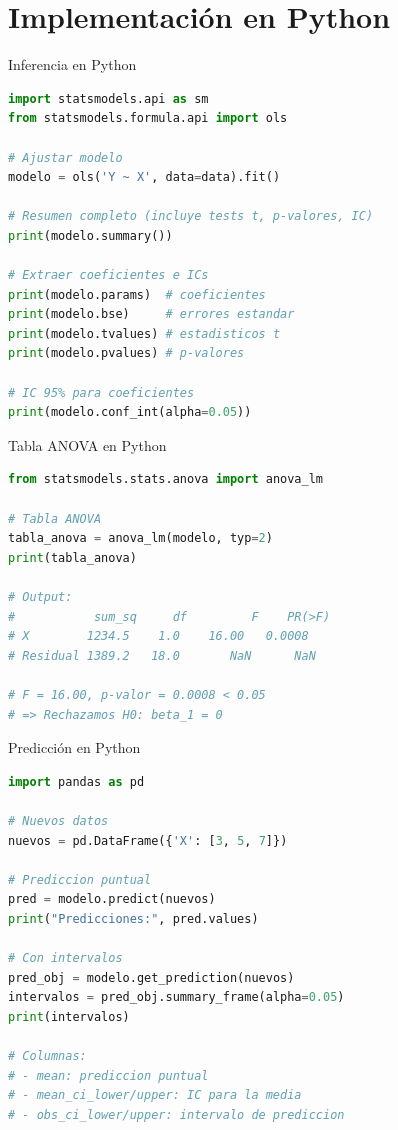 \documentclass[aspectratio=169]{beamer}
\begin{document}
\section{Implementación en Python}

\begin{frame}[fragile]{Inferencia en Python}
\begin{lstlisting}[language=Python]
import statsmodels.api as sm
from statsmodels.formula.api import ols

# Ajustar modelo
modelo = ols('Y ~ X', data=data).fit()

# Resumen completo (incluye tests t, p-valores, IC)
print(modelo.summary())

# Extraer coeficientes e ICs
print(modelo.params)  # coeficientes
print(modelo.bse)     # errores estandar
print(modelo.tvalues) # estadisticos t
print(modelo.pvalues) # p-valores

# IC 95% para coeficientes
print(modelo.conf_int(alpha=0.05))
\end{lstlisting}
\end{frame}

\begin{frame}[fragile]{Tabla ANOVA en Python}
\begin{lstlisting}[language=Python]
from statsmodels.stats.anova import anova_lm

# Tabla ANOVA
tabla_anova = anova_lm(modelo, typ=2)
print(tabla_anova)

# Output:
#           sum_sq     df         F    PR(>F)
# X        1234.5    1.0    16.00   0.0008
# Residual 1389.2   18.0       NaN      NaN

# F = 16.00, p-valor = 0.0008 < 0.05
# => Rechazamos H0: beta_1 = 0
\end{lstlisting}
\end{frame}

\begin{frame}[fragile]{Predicción en Python}
\begin{lstlisting}[language=Python]
import pandas as pd

# Nuevos datos
nuevos = pd.DataFrame({'X': [3, 5, 7]})

# Prediccion puntual
pred = modelo.predict(nuevos)
print("Predicciones:", pred.values)

# Con intervalos
pred_obj = modelo.get_prediction(nuevos)
intervalos = pred_obj.summary_frame(alpha=0.05)
print(intervalos)

# Columnas:
# - mean: prediccion puntual
# - mean_ci_lower/upper: IC para la media
# - obs_ci_lower/upper: intervalo de prediccion
\end{lstlisting}
\end{frame}
\end{document}
